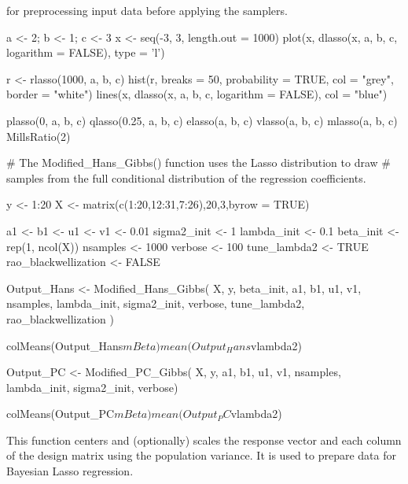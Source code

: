 \documentclass[a4paper]{book}
\begin{document}
\begin{Value}
\begin{itemize}
\begin{description}
\end{description}



\end{itemize}

\end{Value}
%
\begin{SeeAlso}
 for preprocessing input data before applying the samplers.
\end{SeeAlso}
%
\begin{Examples}
\begin{ExampleCode}
a <- 2; b <- 1; c <- 3
x <- seq(-3, 3, length.out = 1000)
plot(x, dlasso(x, a, b, c, logarithm = FALSE), type = 'l')

r <- rlasso(1000, a, b, c)
hist(r, breaks = 50, probability = TRUE, col = "grey", border = "white")
lines(x, dlasso(x, a, b, c, logarithm = FALSE), col = "blue")

plasso(0, a, b, c)
qlasso(0.25, a, b, c)
elasso(a, b, c)
vlasso(a, b, c)
mlasso(a, b, c)
MillsRatio(2)




# The Modified_Hans_Gibbs() function uses the Lasso distribution to draw 
# samples from the full conditional distribution of the regression coefficients.

y <- 1:20
X <- matrix(c(1:20,12:31,7:26),20,3,byrow = TRUE)

a1 <- b1 <- u1 <- v1 <- 0.01
sigma2_init <- 1
lambda_init <- 0.1
beta_init <- rep(1, ncol(X))
nsamples <- 1000
verbose <- 100
tune_lambda2 <- TRUE
rao_blackwellization <- FALSE

Output_Hans <- Modified_Hans_Gibbs(
                X, y, beta_init, a1, b1, u1, v1,
                nsamples, lambda_init, sigma2_init, 
                verbose, tune_lambda2, rao_blackwellization
)

colMeans(Output_Hans$mBeta)
mean(Output_Hans$vlambda2)


Output_PC <- Modified_PC_Gibbs(
               X, y, a1, b1, u1, v1, 
               nsamples, lambda_init, sigma2_init, verbose)

colMeans(Output_PC$mBeta)
mean(Output_PC$vlambda2)

\end{ExampleCode}
\end{Examples}
%
\begin{Description}
This function centers and (optionally) scales the response vector and each column
of the design matrix using the population variance. It is used to prepare data
for Bayesian Lasso regression.
\end{Description}
\end{document}
